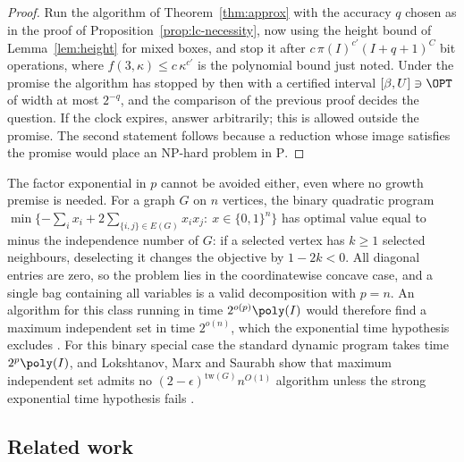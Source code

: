 \begin{proof}
Run the algorithm of Theorem~\ref{thm:approx} with the accuracy $q$ chosen
as in the proof of Proposition~\ref{prop:lc-necessity}, now using the
height bound of Lemma~\ref{lem:height} for mixed boxes, and stop it after
$c\,\pi(I)^{c'}(I+q+1)^C$ bit operations, where $f(3,\kappa)\le
c\,\kappa^{c'}$ is the polynomial bound just noted. Under the promise the
algorithm has stopped by then with a certified interval
$[\beta,U]\ni\OPT$ of width at most $2^{-q}$, and the comparison of the
previous proof decides the question. If the clock expires, answer
arbitrarily; this is allowed outside the promise. The second statement
follows because a reduction whose image satisfies the promise would place
an NP-hard problem in $\mathrm P$.
\end{proof}

\begin{remark}\label{rem:lc-eth}
The factor exponential in $p$ cannot be avoided either, even where no
growth premise is needed. For a graph $G$ on $n$ vertices, the binary
quadratic program
$\min\{-\sum_ix_i+2\sum_{\{i,j\}\in E(G)}x_ix_j:\ x\in\{0,1\}^n\}$ has
optimal value equal to minus the independence number of $G$: if a selected vertex
has $k\ge1$ selected neighbours, deselecting it changes the objective by
$1-2k<0$. All diagonal entries are zero, so the problem lies in the
coordinatewise concave case, and a single bag containing all variables is
a valid decomposition with $p=n$. An algorithm for this class running in
time $2^{o(p)}\poly(I)$ would therefore find a maximum independent set in
time $2^{o(n)}$, which the exponential time hypothesis excludes
\cite{ImpagliazzoPaturiZane2001}. For this binary special case the
standard dynamic program takes time $2^{p}\poly(I)$, and Lokshtanov, Marx
and Saurabh show that maximum independent set admits no
$(2-\epsilon)^{\mathrm{tw}(G)}n^{O(1)}$ algorithm unless the strong
exponential time hypothesis fails \cite{LokshtanovMarxSaurabh2018}.
\end{remark}

\subsection{Related work}\label{sec:lc-related}

